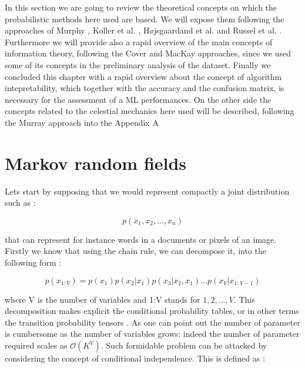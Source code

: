 \documentclass[12pt,%
               a4paper,%
               oneside,openany,%
               titlepage,%
               headinclude,footinclude,%
               BCOR5mm,%
               cleardoublepage=empty,%
               tablecaptionabove,%
               floatperchapter,
               ]{scrreprt}                 %
\begin{document}
In this section we are going to review the theoretical concepts on which the probabilistic methods here used are based. We will expose them following the approaches of Murphy \cite{murphy2012machine},  Koller et al. \cite{koller2009probabilistic}, H{\o}jsgaardand \cite{hojsgaard2012graphical} et al.  and Russel et al. \cite{russell2010artificial}.  Furthermore we will provide also a rapid overview of the main concepts of information theory,  following the Cover \cite{cover2006elements} and MacKay \cite{mackay2003information} approaches,  since we used some of its concepts in the preliminary analysis of the dataset. Finally we concluded this chapter with a rapid overview about the concept of algorithm intepretability, which together with the accuracy and the confusion matrix, is necessary for the assessment of a ML performances. On the other side the concepts related to the celestial mechanics here used will be described, following the Murray approach \cite{murray1999solar} into the Appendix A

\section{Markov random fields}

Lets start by supposing that we would represent compactly a joint distribution such as \cite{murphy2012machine}:

\begin{equation}
p(x_{1},x_{2},...,x_{n})
\end{equation}

that can represent for instance words in a documents or pixels of an image.  Firstly we know that using the chain rule,  we can decompose it, into the following form \cite{murphy2012machine}:

\begin{equation}
p(x_{1:V})=p(x_{1})p(x_{2}|x_{1})p(x_{3}|x_{2},x_{1})...p(x_{V}|x_{1:V-1})
\end{equation}

where V is the number of variables and 1:V stands for ${1,2,...,V}$.  This decomposition makes explicit the conditional probability tables, or in other terms the transition probability tensors \cite{wu2017markov}.  As one can point out the number of parameter is cumbersome as the number of variables grows: indeed the number of parameter required scales as $\mathcal{O}(K^{V})$. 
Such formidable problem can be attacked by considering the concept of conditional independence.  This is defined as  \cite{murphy2012machine}:
\end{document}
